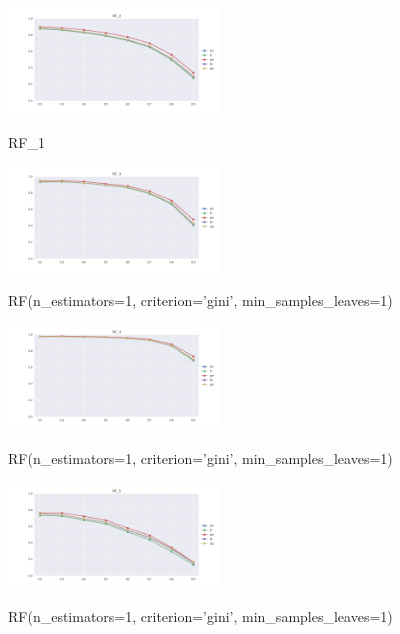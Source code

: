 \documentclass{sig-alternate-05-2015}
\begin{document}
\begin{figure}[]
  \centering
  \caption{RF\_1}
  \includegraphics[width=0.5\textwidth]{../plots/RF_2}
  \label{fig:rf2}
\end{figure}

\begin{figure}[]
  \centering
  \caption{RF(n\_estimators=1, criterion='gini', min\_samples\_leaves=1)}
  \includegraphics[width=0.5\textwidth]{../plots/RF_3}
  \label{fig:rf3}
\end{figure}

\begin{figure}[]
  \centering
  \caption{RF(n\_estimators=1, criterion='gini', min\_samples\_leaves=1)}
  \includegraphics[width=0.5\textwidth]{../plots/RF_4}
  \label{fig:rf4}
\end{figure}

\begin{figure}[]
  \centering
  \caption{RF(n\_estimators=1, criterion='gini', min\_samples\_leaves=1)}
  \includegraphics[width=0.5\textwidth]{../plots/RF_5}
  \label{fig:anomalySetup}
\end{figure}
\end{document}
